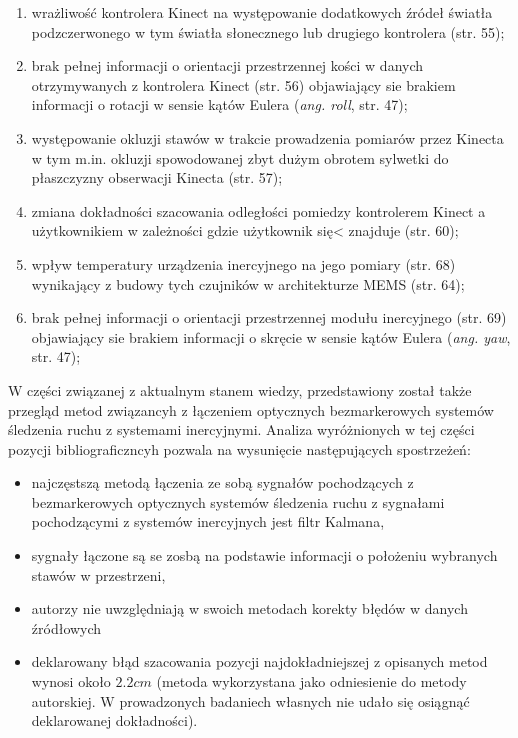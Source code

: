 \documentclass[10pt,a4paper]{article}
\begin{document}
\begin{FlushLeft}
\begin{enumerate}
	\item wrażliwość kontrolera Kinect na występowanie dodatkowych źródeł światła podzczerwonego w tym światła słonecznego lub drugiego kontrolera (str. 55);
	\item brak pełnej informacji o orientacji przestrzennej kości w danych otrzymywanych z kontrolera Kinect (str. 56) objawiający sie brakiem informacji o rotacji w sensie kątów Eulera (\emph{ang. roll}, str. 47);
	\item występowanie okluzji stawów w trakcie prowadzenia pomiarów przez Kinecta w tym m.in. okluzji spowodowanej zbyt dużym obrotem sylwetki do płaszczyzny obserwacji Kinecta (str. 57);
	\item zmiana dokładności szacowania odległości pomiedzy kontrolerem Kinect a użytkownikiem w zależności gdzie użytkownik się< znajduje (str. 60);
	\item wpływ temperatury urządzenia inercyjnego na jego pomiary (str. 68) wynikający z budowy tych czujników w architekturze MEMS (str. 64);
	\item brak pełnej informacji o orientacji przestrzennej modułu inercyjnego (str. 69) objawiający sie brakiem informacji o skręcie w sensie kątów Eulera (\emph{ang. yaw}, str. 47);
\end{enumerate}

W części związanej z aktualnym stanem wiedzy, przedstawiony został także przegląd metod związancyh z łączeniem optycznych bezmarkerowych systemów śledzenia ruchu z systemami inercyjnymi. Analiza wyróżnionych w tej części pozycji bibliograficzncyh pozwala na wysunięcie następujących spostrzeżeń:

\begin{itemize}
\item najczęstszą metodą łączenia ze sobą sygnałów pochodzących z bezmarkerowych optycznych systemów śledzenia ruchu z sygnałami pochodzącymi z systemów inercyjnych jest filtr Kalmana,
\item sygnały łączone są se zosbą na podstawie informacji o położeniu wybranych stawów w przestrzeni,
\item autorzy nie uwzględniają w swoich metodach korekty błędów w danych źródłowych
\item deklarowany błąd szacowania pozycji najdokładniejszej z opisanych metod wynosi około $2.2cm$ (metoda wykorzystana jako odniesienie do metody autorskiej. W prowadzonych badaniech własnych nie udało się osiągnąć deklarowanej dokładności).
\end{itemize}


\end{FlushLeft}
\end{document}
